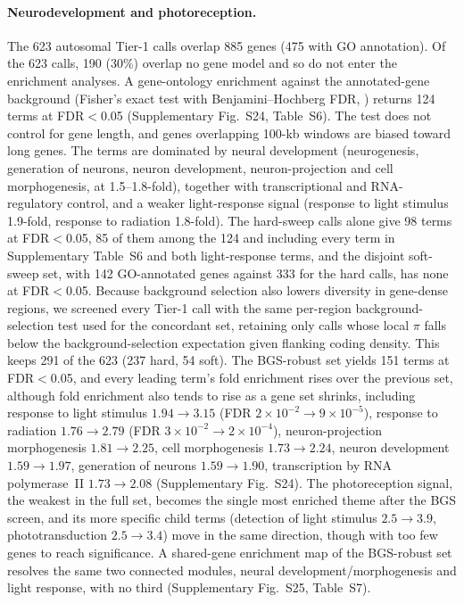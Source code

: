 \documentclass[11pt]{article}
\begin{document}
\paragraph{Neurodevelopment and photoreception.}
The 623 autosomal Tier-1 calls overlap 885 genes (475 with GO annotation). Of the 623 calls, 190 (30\%) overlap no gene model and so do not enter the enrichment analyses. A gene-ontology enrichment against the
annotated-gene background (Fisher's exact test with Benjamini--Hochberg FDR, \citealt{benjamini1995}) returns 124 terms at FDR$<$0.05 (Supplementary Fig.~S24, Table~S6). The test does not control for gene length, and genes overlapping 100-kb windows are biased toward long genes. The terms are dominated by neural development 
(neurogenesis, generation of neurons, neuron development, neuron-projection and cell morphogenesis, at 1.5--1.8-fold), 
together with transcriptional and RNA-regulatory control, and a weaker light-response signal
(response to light stimulus 1.9-fold, response to radiation 1.8-fold). The hard-sweep calls alone give 98 terms at FDR$<$0.05, 85 of them among the 124 and including every term in Supplementary Table~S6 and both light-response terms, and the disjoint soft-sweep set, with 142 GO-annotated genes against 333 for the hard calls, has none at FDR$<$0.05. 
Because background selection also lowers diversity in gene-dense regions, we screened every Tier-1 call with the same per-region
background-selection test used for the concordant set, retaining only calls whose local $\pi$ falls below the
background-selection expectation given flanking coding density. This keeps 291 of the 623 (237 hard, 54
soft). The BGS-robust set yields 151 terms at FDR$<$0.05, and every leading term's fold enrichment rises over the previous set, although fold enrichment also tends to rise as a gene set shrinks, 
including response to light stimulus $1.94\!\to\!3.15$ (FDR $2\times10^{-2}\!\to\!9\times10^{-5}$),
response to radiation $1.76\!\to\!2.79$ (FDR $3\times10^{-2}\!\to\!2\times10^{-4}$),
neuron-projection morphogenesis $1.81\!\to\!2.25$, cell morphogenesis $1.73\!\to\!2.24$,
neuron development $1.59\!\to\!1.97$, generation of neurons $1.59\!\to\!1.90$,
transcription by RNA polymerase~II $1.73\!\to\!2.08$ (Supplementary Fig.~S24).
The photoreception signal, the weakest in the full set, becomes the single most enriched theme after the BGS screen,
and its more specific child terms (detection of light stimulus $2.5\!\to\!3.9$, phototransduction
$2.5\!\to\!3.4$) move in the same direction, though with too few genes to reach significance. A shared-gene
enrichment map of the BGS-robust set resolves the same two connected modules, neural
development/morphogenesis and light response, with no third (Supplementary Fig.~S25, Table~S7).
\end{document}

